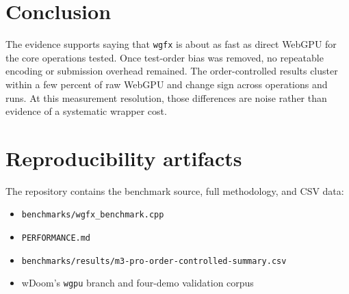 \documentclass[11pt]{article}
\begin{document}
\section{Conclusion}

The evidence supports saying that \texttt{wgfx} is about as fast as direct
WebGPU for the core operations tested. Once test-order bias was removed, no
repeatable encoding or submission overhead remained. The order-controlled
results cluster within a few percent of raw WebGPU and change sign across
operations and runs. At this measurement resolution, those differences are
noise rather than evidence of a systematic wrapper cost.

\section*{Reproducibility artifacts}

The repository contains the benchmark source, full methodology, and CSV data:

\begin{itemize}
  \item \texttt{benchmarks/wgfx\_benchmark.cpp}
  \item \texttt{PERFORMANCE.md}
  \item \texttt{benchmarks/results/m3-pro-order-controlled-summary.csv}
  \item wDoom's \texttt{wgpu} branch and four-demo validation corpus
\end{itemize}
\end{document}
